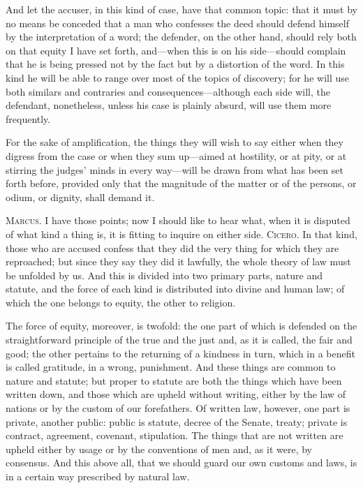  And let the accuser, in this kind of case, have that common topic: that it must by no means be conceded that a man who confesses the deed should defend himself by the interpretation of a word; the defender, on the other hand, should rely both on that equity I have set forth, and—when this is on his side—should complain that he is being pressed not by the fact but by a distortion of the word. In this kind he will be able to range over most of the topics of discovery; for he will use both similars and contraries and consequences—although each side will, the defendant, nonetheless, unless his case is plainly absurd, will use them more frequently.

 For the sake of amplification, the things they will wish to say either when they digress from the case or when they sum up—aimed at hostility, or at pity, or at stirring the judges' minds in every way—will be drawn from what has been set forth before, provided only that the magnitude of the matter or of the persons, or odium, or dignity, shall demand it.

 \textsc{Marcus.} I have those points; now I should like to hear what, when it is disputed of what kind a thing is, it is fitting to inquire on either side. \textsc{Cicero.} In that kind, those who are accused confess that they did the very thing for which they are reproached; but since they say they did it lawfully, the whole theory of law must be unfolded by us. And this is divided into two primary parts, nature and statute, and the force of each kind is distributed into divine and human law; of which the one belongs to equity, the other to religion.

 The force of equity, moreover, is twofold: the one part of which is defended on the straightforward principle of the true and the just and, as it is called, the fair and good; the other pertains to the returning of a kindness in turn, which in a benefit is called gratitude, in a wrong, punishment. And these things are common to nature and statute; but proper to statute are both the things which have been written down, and those which are upheld without writing, either by the law of nations or by the custom of our forefathers. Of written law, however, one part is private, another public: public is statute, decree of the Senate, treaty; private is contract, agreement, covenant, stipulation. The things that are not written are upheld either by usage or by the conventions of men and, as it were, by consensus. And this above all, that we should guard our own customs and laws, is in a certain way prescribed by natural law.

